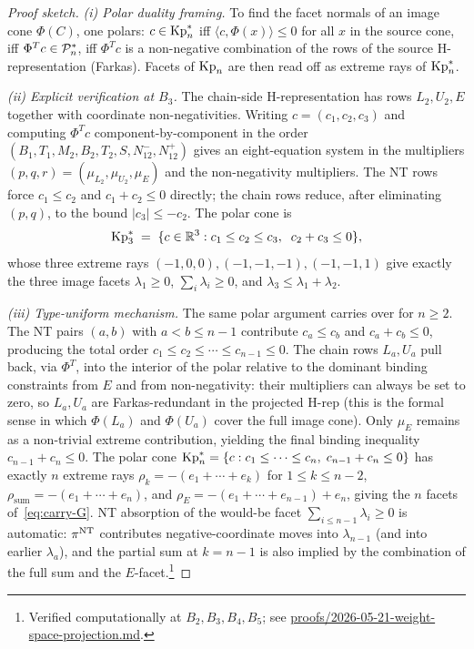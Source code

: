 \begin{proof}[Proof sketch]
\emph{(i) Polar duality framing.} To find the facet normals of an image cone
$\Phi(C)$, one polars: $c \in \mathrm{Kp}_n^*$ iff $\langle c, \Phi(x)\rangle \le 0$
for all $x$ in the source cone, iff $\Phi^T c \in \mathcal{P}_n^*$, iff $\Phi^T c$ is a
non-negative combination of the rows of the source H-representation (Farkas).
Facets of $\mathrm{Kp}_n$ are then read off as extreme rays of $\mathrm{Kp}_n^*$.

\emph{(ii) Explicit verification at $B_3$.} The chain-side H-representation has
rows $L_2, U_2, E$ together with coordinate non-negativities. Writing
$c = (c_1, c_2, c_3)$ and computing $\Phi^T c$ component-by-component in the
order $(B_1, T_1, M_2, B_2, T_2, S, N^-_{12}, N^+_{12})$ gives an eight-equation
system in the multipliers $(p, q, r) = (\mu_{L_2}, \mu_{U_2}, \mu_E)$ and the
non-negativity multipliers. The NT rows force $c_1 \le c_2$ and
$c_1 + c_2 \le 0$ directly; the chain rows reduce, after eliminating $(p, q)$,
to the bound $|c_3| \le -c_2$. The polar cone is
\[
   \mathrm{Kp}_3^* \;=\; \{c \in \mathbb{R}^3 : c_1 \le c_2 \le c_3,\;\; c_2 + c_3 \le 0\},
\]
whose three extreme rays $(-1, 0, 0), (-1, -1, -1), (-1, -1, 1)$ give exactly
the three image facets $\lambda_1 \ge 0$, $\sum_i \lambda_i \ge 0$, and
$\lambda_3 \le \lambda_1 + \lambda_2$.

\emph{(iii) Type-uniform mechanism.} The same polar argument carries over for
$n \ge 2$. The NT pairs $(a, b)$ with $a < b \le n - 1$ contribute
$c_a \le c_b$ and $c_a + c_b \le 0$, producing the total order
$c_1 \le c_2 \le \cdots \le c_{n-1} \le 0$. The chain rows $L_a, U_a$ pull
back, via $\Phi^T$, into the interior of the polar relative to the dominant
binding constraints from $E$ and from non-negativity: their multipliers can
always be set to zero, so $L_a, U_a$ are Farkas-redundant in the projected
H-rep (this is the formal sense in which $\Phi(L_a)$ and $\Phi(U_a)$ cover the
full image cone). Only $\mu_E$ remains as a non-trivial extreme contribution,
yielding the final binding inequality $c_{n-1} + c_n \le 0$. The polar cone
$\mathrm{Kp}_n^* = \{c : c_1 \le \cdots \le c_n,\; c_{n-1} + c_n \le 0\}$ has exactly
$n$ extreme rays $\rho_k = -(e_1 + \cdots + e_k)$ for $1 \le k \le n - 2$,
$\rho_{\mathrm{sum}} = -(e_1 + \cdots + e_n)$, and $\rho_E = -(e_1 + \cdots +
e_{n-1}) + e_n$, giving the $n$ facets of~\eqref{eq:carry-G}. NT absorption of
the would-be facet $\sum_{i \le n-1} \lambda_i \ge 0$ is automatic: $\pi^{\mathrm{NT}}$
contributes negative-coordinate moves into $\lambda_{n-1}$ (and into earlier
$\lambda_a$), and the partial sum at $k = n - 1$ is also implied by the
combination of the full sum and the $E$-facet.\footnote{Verified
computationally at $B_2, B_3, B_4, B_5$; see
\url{proofs/2026-05-21-weight-space-projection.md}.}
\end{proof}

